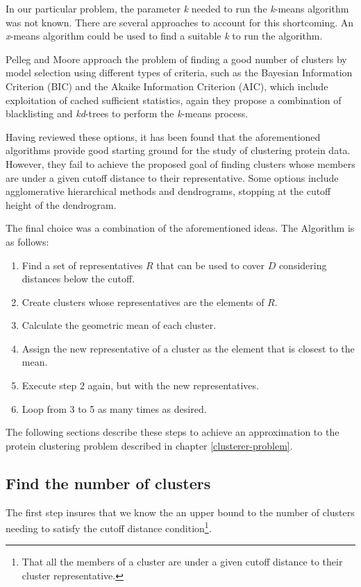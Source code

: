 \documentclass[a4paper,12pt,english]{report}
\begin{document}
In our particular problem, the parameter \emph{k} needed to run the \emph{k}-means algorithm was not known. There are several approaches to account for this shortcoming. An \emph{x}-means algorithm could be used to find a suitable \emph{k} to run the algorithm. 

Pelleg and Moore\cite{xmeans} approach the problem of finding a good number of clusters by model selection using different types of criteria, such as the Bayesian Information Criterion (BIC) and the Akaike Information Criterion (AIC), which include exploitation of cached sufficient statistics, again they propose a combination of blacklisting and \emph{kd}-trees to perform the \emph{k}-means process.

Having reviewed these options, it has been found that the aforementioned algorithms provide good starting ground for the study of clustering protein data. However, they fail to achieve the proposed goal of finding clusters whose members are under a given cutoff distance to their representative. Some options include agglomerative hierarchical methods and dendrograms, stopping at the cutoff height of the dendrogram.

The final choice was a combination of the aforementioned ideas. The Algorithm is as follows:
\begin{enumerate}
\item Find a set of representatives $R$ that can be used to cover $D$ considering distances below the cutoff.
\item Create clusters whose representatives are the elements of $R$.
\item Calculate the geometric mean of each cluster.
\item Assign the new representative of a cluster as the element that is closest to the mean.
\item Execute step 2 again, but with the new representatives.
\item Loop from 3 to 5 as many times as desired.
\end{enumerate}

The following sections describe these steps to achieve an approximation to the protein clustering problem described in chapter \ref{clusterer-problem}.

\subsection{Find the number of clusters}

The first step insures that we know the an upper bound to the number of clusters needing to satisfy the cutoff distance condition\footnote{That all the members of a cluster are under a given cutoff distance to their cluster representative.}. 
\end{document}
